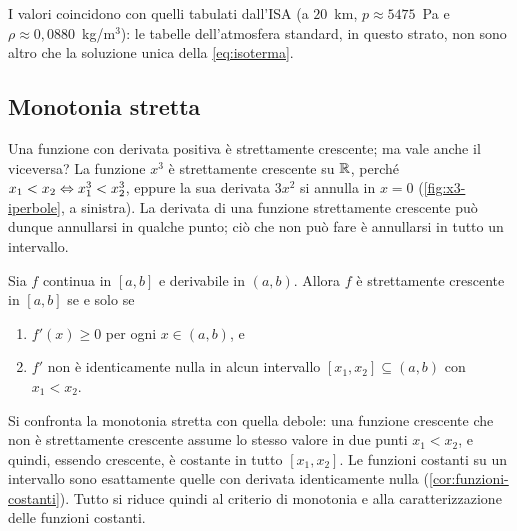 I valori coincidono con quelli tabulati dall'ISA (a $20$~km, $p\approx5475$~Pa e
$\rho\approx0{,}0880$~kg/m$^{3}$): le tabelle dell'atmosfera standard, in questo strato,
non sono altro che la soluzione unica della \eqref{eq:isoterma}.

\subsection{Monotonia stretta}

Una funzione con derivata positiva è strettamente crescente; ma vale anche il
viceversa? La funzione $x^{3}$ è strettamente crescente su $\mathbb{R}$, perché
$x_{1}<x_{2}\Leftrightarrow x_{1}^{3}<x_{2}^{3}$, eppure la sua derivata $3x^{2}$ si annulla in
$x=0$ (\cref{fig:x3-iperbole}, a sinistra). La derivata di una funzione strettamente
crescente può dunque annullarsi in qualche punto; ciò che non può fare è annullarsi in
tutto un intervallo.

\begin{teorema}\label{teo:stretta-monotonia}
Sia $f$ continua in $[a,b]$ e derivabile in $(a,b)$. Allora $f$ è strettamente
crescente in $[a,b]$ se e solo se
\begin{enumerate}[label=\textup{(\roman*)}]
  \item $f'(x)\ge0$ per ogni $x\in(a,b)$, e
  \item $f'$ non è identicamente nulla in alcun intervallo $[x_{1},x_{2}]\subseteq(a,b)$
  con $x_{1}<x_{2}$.
\end{enumerate}
\end{teorema}

\begin{schema}
\end{schema}

\begin{strategia}
Si confronta la monotonia stretta con quella debole: una funzione crescente che non è
strettamente crescente assume lo stesso valore in due punti $x_{1}<x_{2}$, e quindi,
essendo crescente, è costante in tutto $[x_{1},x_{2}]$. Le funzioni costanti su un
intervallo sono esattamente quelle con derivata identicamente nulla
(\cref{cor:funzioni-costanti}). Tutto si riduce quindi al criterio di monotonia e alla
caratterizzazione delle funzioni costanti.
\end{strategia}

